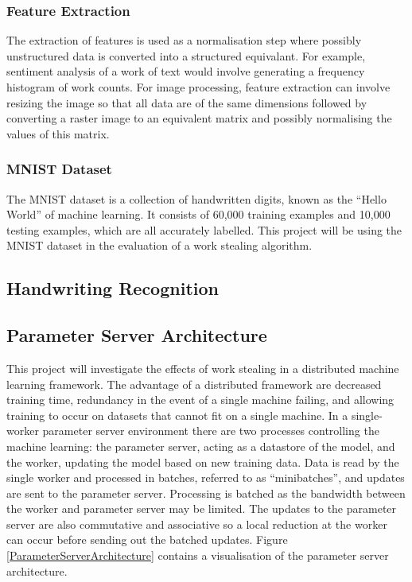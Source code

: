 \documentclass[12pt]{article}
\begin{document}
\subsubsection{Feature Extraction}
The extraction of features is used as a normalisation step where possibly unstructured data is converted into a structured equivalant. For example, sentiment analysis of a work of text would involve generating a frequency histogram of work counts.
\newline
\newline
For image processing, feature extraction can involve resizing the image so that all data are of the same dimensions followed by converting a raster image to an equivalent matrix and possibly normalising the values of this matrix.
\newline
\subsubsection{MNIST Dataset}
The MNIST dataset is a collection of handwritten digits, known as the ``Hello World'' of machine learning. It consists of 60,000 training examples and 10,000 testing examples, which are all accurately labelled. This project will be using the MNIST dataset in the evaluation of a work stealing algorithm.
\newline
\subsection{Handwriting Recognition}
\subsection{Parameter Server Architecture}
This project will investigate the effects of work stealing in a distributed machine learning framework. The advantage of a distributed framework are decreased training time, redundancy in the event of a single machine failing, and allowing training to occur on datasets that cannot fit on a single machine.
\newline
\newline
In a single-worker parameter server environment there are two processes controlling the machine learning: the parameter server, acting as a datastore of the model, and the worker, updating the model based on new training data. Data is read by the single worker and processed in batches, referred to as ``minibatches'', and updates are sent to the parameter server. Processing is batched as the bandwidth between the worker and parameter server may be limited. The updates to the parameter server are also commutative and associative so a local reduction at the worker can occur before sending out the batched updates.
\newline
Figure \ref{ParameterServerArchitecture} contains a visualisation of the parameter server architecture.
\end{document}
